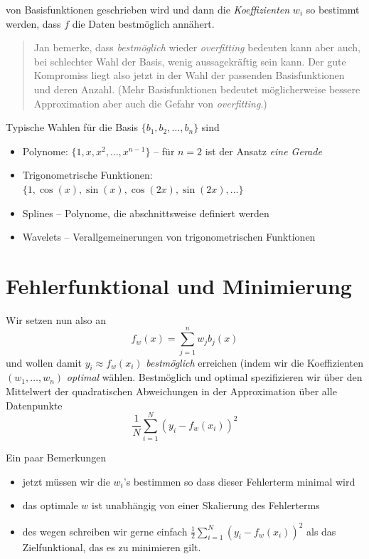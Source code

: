 \documentclass[]{book}
\providecommand{\tightlist}{%
  \setlength{\itemsep}{0pt}\setlength{\parskip}{0pt}}
\theoremstyle{definition}
\theoremstyle{definition}
\theoremstyle{definition}
\theoremstyle{definition}
\theoremstyle{remark}
\begin{document}
von Basisfunktionen geschrieben wird und dann die \emph{Koeffizienten} \(w_i\) so bestimmt werden, dass \(f\) die Daten bestmöglich annähert.

\begin{quote}
Jan bemerke, dass \emph{bestmöglich} wieder \emph{overfitting} bedeuten kann aber auch, bei schlechter Wahl der Basis, wenig aussagekräftig sein kann. Der gute Kompromiss liegt also jetzt in der Wahl der passenden Basisfunktionen und deren Anzahl. (Mehr Basisfunktionen bedeutet möglicherweise bessere Approximation aber auch die Gefahr von \emph{overfitting}.)
\end{quote}

Typische Wahlen für die Basis \(\{b_1, b_2, \dotsc, b_n\}\) sind

\begin{itemize}
\tightlist
\item
  Polynome: \(\{1, x, x^2, \dotsc, x^{n-1}\}\) -- für \(n=2\) ist der Ansatz \emph{eine Gerade}
\item
  Trigonometrische Funktionen: \(\{1, \cos(x), \sin(x), \cos(2x), \sin(2x), \dotsc\}\)
\item
  Splines -- Polynome, die abschnittsweise definiert werden
\item
  Wavelets -- Verallgemeinerungen von trigonometrischen Funktionen
\end{itemize}

\hypertarget{fehlerfunktional-und-minimierung}{%
\section{Fehlerfunktional und Minimierung}\label{fehlerfunktional-und-minimierung}}

Wir setzen nun also an
\begin{equation*}
f_w(x) = \sum_{j=1}^nw_j b_j (x)
\end{equation*}
und wollen damit \(y_i \approx f_w(x_i)\) \emph{bestmöglich} erreichen (indem wir die Koeffizienten \((w_1, \dotsc, w_n)\) \emph{optimal} wählen. Bestmöglich und optimal spezifizieren wir über den Mittelwert der quadratischen Abweichungen in der Approximation über alle Datenpunkte
\begin{equation*}
\frac{1}{N}\sum_{i=1}^N (y_i - f_w(x_i))^2
\end{equation*}

Ein paar Bemerkungen

\begin{itemize}
\tightlist
\item
  jetzt müssen wir die \(w_i\)'s bestimmen so dass dieser Fehlerterm minimal wird
\item
  das optimale \(w\) ist unabhängig von einer Skalierung des Fehlerterms
\item
  des wegen schreiben wir gerne einfach \(\frac 12 \sum_{i=1}^N (y_i - f_w(x_i))^2\) als das Zielfunktional, das es zu minimieren gilt.
\end{itemize}
\end{document}
